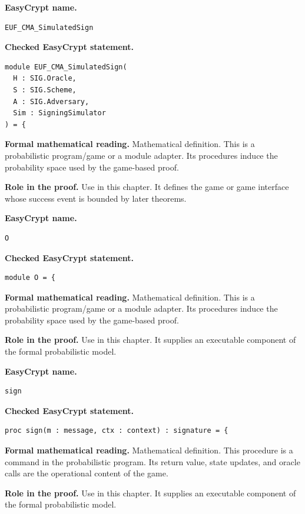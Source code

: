 \begin{formaldefinition}
\noindent\textbf{EasyCrypt name.}
\begin{lstlisting}[language=EasyCrypt,basicstyle=\ttfamily\scriptsize]
EUF_CMA_SimulatedSign
\end{lstlisting}
\noindent\textbf{Checked EasyCrypt statement.}
\begin{lstlisting}[language=EasyCrypt,basicstyle=\ttfamily\scriptsize]
module EUF_CMA_SimulatedSign(
  H : SIG.Oracle,
  S : SIG.Scheme,
  A : SIG.Adversary,
  Sim : SigningSimulator
) = {
\end{lstlisting}
\noindent\textbf{Formal mathematical reading.}
Mathematical definition. This is a probabilistic program/game or a module adapter.  Its procedures induce the probability space used by the game-based proof.

\noindent\textbf{Role in the proof.}
Use in this chapter. It defines the game or game interface whose success event is bounded by later theorems.

\end{formaldefinition}

\begin{formaldefinition}
\noindent\textbf{EasyCrypt name.}
\begin{lstlisting}[language=EasyCrypt,basicstyle=\ttfamily\scriptsize]
O
\end{lstlisting}
\noindent\textbf{Checked EasyCrypt statement.}
\begin{lstlisting}[language=EasyCrypt,basicstyle=\ttfamily\scriptsize]
module O = {
\end{lstlisting}
\noindent\textbf{Formal mathematical reading.}
Mathematical definition. This is a probabilistic program/game or a module adapter.  Its procedures induce the probability space used by the game-based proof.

\noindent\textbf{Role in the proof.}
Use in this chapter. It supplies an executable component of the formal probabilistic model.

\end{formaldefinition}

\begin{formaldefinition}
\noindent\textbf{EasyCrypt name.}
\begin{lstlisting}[language=EasyCrypt,basicstyle=\ttfamily\scriptsize]
sign
\end{lstlisting}
\noindent\textbf{Checked EasyCrypt statement.}
\begin{lstlisting}[language=EasyCrypt,basicstyle=\ttfamily\scriptsize]
proc sign(m : message, ctx : context) : signature = {
\end{lstlisting}
\noindent\textbf{Formal mathematical reading.}
Mathematical definition. This procedure is a command in the probabilistic program.  Its return value, state updates, and oracle calls are the operational content of the game.

\noindent\textbf{Role in the proof.}
Use in this chapter. It supplies an executable component of the formal probabilistic model.

\end{formaldefinition}

